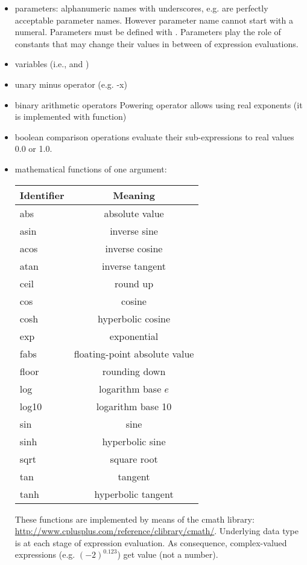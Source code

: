 \begin{itemize}
\item parameters: alphanumeric names with underscores, e.g.  are perfectly acceptable parameter names. However
parameter name cannot start with a numeral. Parameters must be defined with
. Parameters play the role of constants
that may change their values in between of expression evaluations.

\item variables (i.e.,  and )
\item unary minus operator (e.g. {{{-x}}})
\item binary arithmetic operators \inltt{+, -, *, /, \^}
   Powering operator allows using real exponents (it is implemented with
    function)
\item boolean comparison operations \inlsh{<, <=, >, >=, ==} evaluate their
sub-expressions to real values 0.0 or 1.0.
\item mathematical functions of one argument:
\begin{center}
\begin{tabular}{lc}
\toprule
Identifier & Meaning \\
\midrule
abs     & absolute value \\
asin    & inverse sine \\
acos    & inverse cosine \\
atan    & inverse tangent \\
ceil    & round up \\
cos     & cosine \\
cosh    & hyperbolic cosine \\
exp     & exponential \\
fabs    & floating-point absolute value \\
floor   & rounding down \\
log     & logarithm base $e$ \\
log10   & logarithm base 10 \\
sin     & sine \\
sinh    & hyperbolic sine \\
sqrt    & square root \\
tan     & tangent \\
tanh    & hyperbolic tangent \\
\bottomrule
\end{tabular}
\end{center}

 These functions are implemented by means of the cmath library:
 \url{http://www.cplusplus.com/reference/clibrary/cmath/}. Underlying data
 type is  at each stage of expression evaluation. As
 consequence, complex-valued expressions (e.g. $(-2)^0.123$) get value
  (not a number).


\end{itemize}
